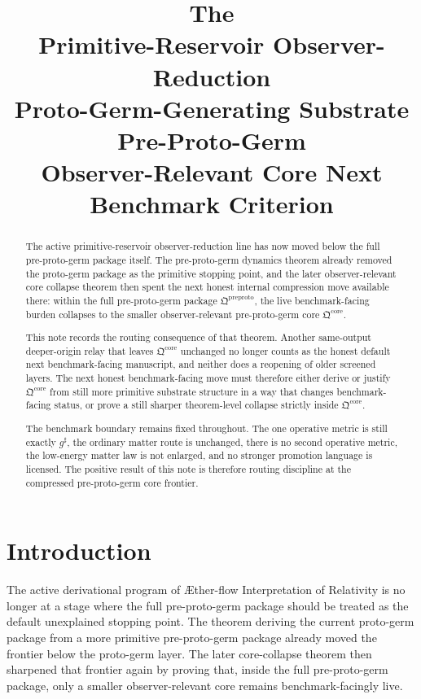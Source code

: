 \documentclass[11pt]{article}
\title{\textbf{The \TheoryName{}}\\[0.4em]
\large Primitive-Reservoir Observer-Reduction\\
\large Proto-Germ-Generating Substrate Pre-Proto-Germ\\
\large Observer-Relevant Core Next Benchmark Criterion}
\author{}
\date{}
\newcommand{\Aflow}{\AE{}ther-flow}
\newcommand{\TheoryName}{\Aflow{} Interpretation of Relativity}
\newcommand{\CompletedMetric}{g^{\sharp}}
\newcommand{\PreProtoPackage}{\mathfrak Q^{\mathrm{preproto}}}
\newcommand{\PreProtoCore}{\mathfrak Q^{\mathrm{core}}}
\begin{document}
\maketitle

\begin{abstract}
The active primitive-reservoir observer-reduction line has now moved below the full pre-proto-germ package itself. The pre-proto-germ dynamics theorem already removed the proto-germ package as the primitive stopping point, and the later observer-relevant core collapse theorem then spent the next honest internal compression move available there: within the full pre-proto-germ package \(\PreProtoPackage\), the live benchmark-facing burden collapses to the smaller observer-relevant pre-proto-germ core \(\PreProtoCore\).

This note records the routing consequence of that theorem. Another same-output deeper-origin relay that leaves \(\PreProtoCore\) unchanged no longer counts as the honest default next benchmark-facing manuscript, and neither does a reopening of older screened layers. The next honest benchmark-facing move must therefore either derive or justify \(\PreProtoCore\) from still more primitive substrate structure in a way that changes benchmark-facing status, or prove a still sharper theorem-level collapse strictly inside \(\PreProtoCore\).

The benchmark boundary remains fixed throughout. The one operative metric is still exactly \(\CompletedMetric\), the ordinary matter route is unchanged, there is no second operative metric, the low-energy matter law is not enlarged, and no stronger promotion language is licensed. The positive result of this note is therefore routing discipline at the compressed pre-proto-germ core frontier.
\end{abstract}

\section{Introduction}

The active derivational program of \TheoryName{} is no longer at a stage where the full pre-proto-germ package should be treated as the default unexplained stopping point. The theorem deriving the current proto-germ package from a more primitive pre-proto-germ package already moved the frontier below the proto-germ layer. The later core-collapse theorem then sharpened that frontier again by proving that, inside the full pre-proto-germ package, only a smaller observer-relevant core remains benchmark-facingly live.
\end{document}
